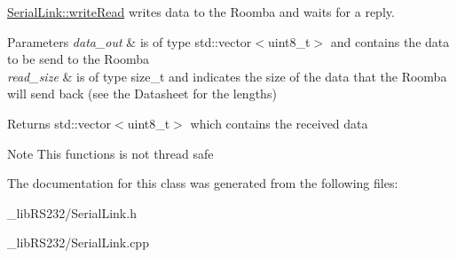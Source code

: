 \hyperlink{class_serial_link_a0931b11edd0b82764f1e538ac08b96bb}{Serial\+Link\+::write\+Read} writes data to the Roomba and waits for a reply. 


\begin{DoxyParams}{Parameters}
{\em data\+\_\+out} & is of type std\+::vector$<$uint8\+\_\+t$>$ and contains the data to be send to the Roomba \\
\hline
{\em read\+\_\+size} & is of type size\+\_\+t and indicates the size of the data that the Roomba will send back (see the Datasheet for the lengths) \\
\hline
\end{DoxyParams}
\begin{DoxyReturn}{Returns}
std\+::vector$<$uint8\+\_\+t$>$ which contains the received data 
\end{DoxyReturn}
\begin{DoxyNote}{Note}
This functions is not thread safe 
\end{DoxyNote}


The documentation for this class was generated from the following files\+:\begin{DoxyCompactItemize}
\item 
\+\_\+lib\+R\+S232/Serial\+Link.\+h\item 
\+\_\+lib\+R\+S232/Serial\+Link.\+cpp\end{DoxyCompactItemize}
